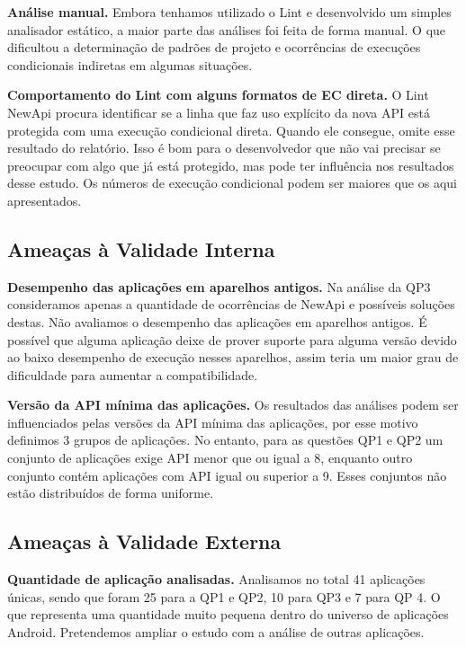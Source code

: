 \textbf{Análise manual.} Embora tenhamos utilizado o Lint e desenvolvido um simples
analisador estático, a maior parte das análises foi feita de forma manual. O que
dificultou a determinação de padrões de projeto e ocorrências de execuções condicionais
indiretas em algumas situações.

\textbf{Comportamento do Lint com alguns formatos de EC direta.} O Lint NewApi procura
identificar se a linha que faz uso explícito da nova API está protegida com uma execução
condicional direta. Quando ele consegue, omite esse resultado do relatório. Isso é bom
para o desenvolvedor que não vai precisar se preocupar com algo que já está protegido,
mas pode ter influência nos resultados desse estudo. Os números de execução condicional
podem ser maiores que os aqui apresentados.

\subsection{Ameaças à Validade Interna} \label{subsec:ameacas_interna}

\textbf{Desempenho das aplicações em aparelhos antigos.} Na análise da QP3
consideramos apenas a quantidade de ocorrências de NewApi e possíveis soluções
destas. Não avaliamos o desempenho das aplicações em aparelhos antigos. É possível
que alguma aplicação deixe de prover suporte para alguma versão devido ao baixo
desempenho de execução nesses aparelhos, assim teria um maior grau de dificuldade
para aumentar a compatibilidade.

\textbf{Versão da API mínima das aplicações.} Os resultados das análises podem ser
influenciados pelas versões da API mínima das aplicações, por esse motivo definimos
3 grupos de aplicações. No entanto, para as questões QP1 e QP2 um conjunto de aplicações
exige API menor que ou igual a 8, enquanto outro conjunto contém aplicações com API igual
ou superior a 9. Esses conjuntos não estão distribuídos de forma uniforme.

\subsection{Ameaças à Validade Externa} \label{subsec:ameacas_externa}

\textbf{Quantidade de aplicação analisadas.} Analisamos no total 41 aplicações únicas,
sendo que foram 25 para a QP1 e QP2, 10 para QP3 e 7 para QP 4. O que representa uma
quantidade muito pequena dentro do universo de aplicações Android. Pretendemos ampliar
o estudo com a análise de outras aplicações. 